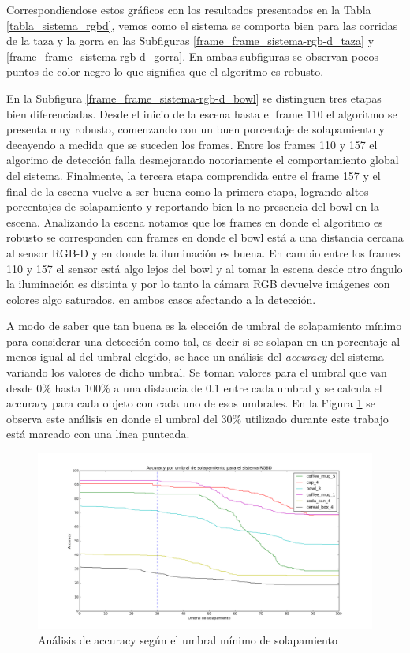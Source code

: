 Correspondiendose estos gráficos con los resultados presentados en la Tabla \ref{tabla_sistema_rgbd}, vemos como el sistema se comporta bien para las corridas de la taza y la gorra en las Subfiguras \ref{frame_frame_sistema-rgb-d_taza} y \ref{frame_frame_sistema-rgb-d_gorra}. En ambas subfiguras se observan pocos puntos de color negro lo que significa que el algoritmo es robusto.

En la Subfigura \ref{frame_frame_sistema-rgb-d_bowl} se distinguen tres etapas bien diferenciadas. Desde el inicio de la escena hasta el frame 110 el algoritmo se presenta muy robusto, comenzando con un buen porcentaje de solapamiento y decayendo a medida que se suceden los frames. Entre los frames 110 y 157 el algorimo de detección falla desmejorando notoriamente el comportamiento global del sistema. Finalmente, la tercera etapa comprendida entre el frame 157 y el final de la escena vuelve a ser buena como la primera etapa, logrando altos porcentajes de solapamiento y reportando bien la no presencia del bowl en la escena. Analizando la escena notamos que los frames en donde el algoritmo es robusto se corresponden con frames en donde el bowl está a una distancia cercana al sensor RGB-D y en donde la iluminación es buena. En cambio entre los frames 110 y 157 el sensor está algo lejos del bowl y al tomar la escena desde otro ángulo la iluminación es distinta y por lo tanto la cámara RGB devuelve imágenes con colores algo saturados, en ambos casos afectando a la detección.

A modo de saber que tan buena es la elección de umbral de solapamiento mínimo para considerar una detección como tal, es decir si se solapan en un porcentaje al menos igual al del umbral elegido, se hace un análisis del \textit{accuracy} del sistema variando los valores de dicho umbral. Se toman valores para el umbral que van desde 0\% hasta 100\% a una distancia de 0.1 entre cada umbral y se calcula el accuracy para cada objeto con cada uno de esos umbrales. En la Figura \ref{fig:accuracy_sistema} se observa este análisis en donde el umbral del 30\% utilizado durante este trabajo está marcado con una línea punteada.

\begin{figure}
	\centering
	\includegraphics[width=\textwidth]{img/accuracy_sistemaRGBD.png}
	\caption{Análisis de accuracy según el umbral mínimo de solapamiento}
	\label{fig:accuracy_sistema}
\end{figure}

